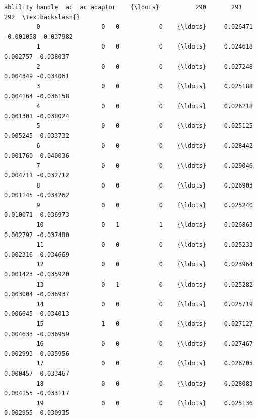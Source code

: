 \documentclass[11pt]{article}
\begin{document}
\begin{Verbatim}[commandchars=\\\{\}]
             ablility handle  ac  ac adaptor    {\ldots}          290       291       292  \textbackslash{}
         0                 0   0           0    {\ldots}     0.026471 -0.001058 -0.037982   
         1                 0   0           0    {\ldots}     0.024618  0.002757 -0.038037   
         2                 0   0           0    {\ldots}     0.027248  0.004349 -0.034061   
         3                 0   0           0    {\ldots}     0.025188  0.004164 -0.036158   
         4                 0   0           0    {\ldots}     0.026218  0.001301 -0.038024   
         5                 0   0           0    {\ldots}     0.025125  0.005245 -0.033732   
         6                 0   0           0    {\ldots}     0.028442  0.001760 -0.040036   
         7                 0   0           0    {\ldots}     0.029046  0.004711 -0.032712   
         8                 0   0           0    {\ldots}     0.026903  0.001145 -0.034262   
         9                 0   0           0    {\ldots}     0.025240  0.010071 -0.036973   
         10                0   1           1    {\ldots}     0.026863  0.002797 -0.037480   
         11                0   0           0    {\ldots}     0.025233  0.002316 -0.034669   
         12                0   0           0    {\ldots}     0.023964  0.001423 -0.035920   
         13                0   1           0    {\ldots}     0.025282  0.003004 -0.036937   
         14                0   0           0    {\ldots}     0.025719  0.006645 -0.034013   
         15                1   0           0    {\ldots}     0.027127  0.004633 -0.036959   
         16                0   0           0    {\ldots}     0.027467  0.002993 -0.035956   
         17                0   0           0    {\ldots}     0.026705  0.000457 -0.033467   
         18                0   0           0    {\ldots}     0.028083  0.004155 -0.033117   
         19                0   0           0    {\ldots}     0.025136  0.002955 -0.030935   
         

\end{Verbatim}
\end{document}
